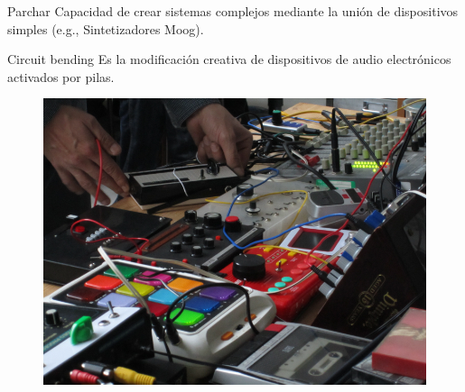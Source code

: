 \documentclass{beamer}
\begin{document}
		\begin{frame}{Parchar}
			Capacidad de crear sistemas complejos mediante la unión de dispositivos simples (e.g., Sintetizadores Moog).\vspace{0.5cm}
			
			\centering
	
		\end{frame}
		
%			
%			
		
		\begin{frame}{Circuit bending}
			Es la modificación creativa de dispositivos de audio electrónicos activados por pilas.
			\begin{figure}
				\centering
				\includegraphics[scale=0.25]{bending}
			\end{figure}
		\end{frame}				
\end{document}
